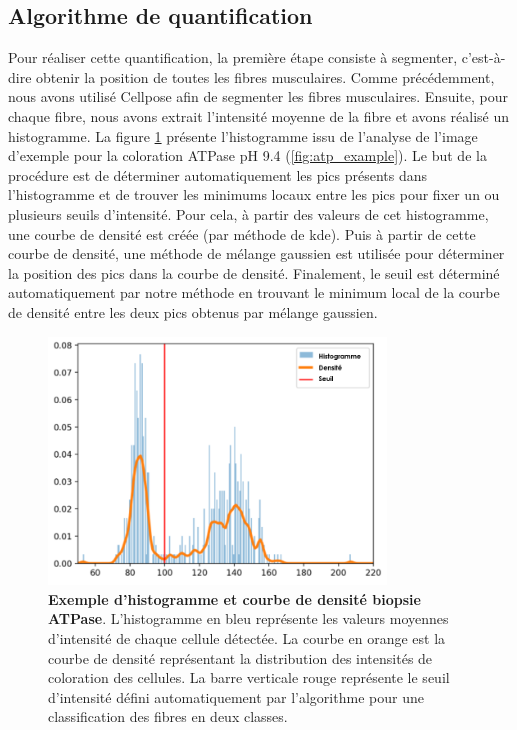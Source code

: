 \subsection{Algorithme de quantification}
Pour réaliser cette quantification, la première étape consiste à segmenter, c'est-à-dire obtenir la position de toutes les fibres musculaires. Comme précédemment, nous avons utilisé Cellpose afin de segmenter les fibres musculaires. Ensuite, pour chaque fibre, nous avons extrait l'intensité moyenne de la fibre et avons réalisé un histogramme. La figure \ref{fig:atp_density} présente l'histogramme issu de l'analyse de l'image d'exemple pour la coloration ATPase pH 9.4 (\ref{fig:atp_example}). Le but de la procédure est de déterminer automatiquement les pics présents dans l'histogramme et de trouver les minimums locaux entre les pics pour fixer un ou plusieurs seuils d'intensité. Pour cela, à partir des valeurs de cet histogramme, une courbe de densité est créée (par méthode de \gls{kde}). Puis à partir de cette courbe de densité, une méthode de mélange gaussien est utilisée pour déterminer la position des pics dans la courbe de densité. Finalement, le seuil est déterminé automatiquement par notre méthode en trouvant le minimum local de la courbe de densité entre les deux pics obtenus par mélange gaussien.
\begin{figure}[!htbp]
 \centering
 \includegraphics[width=0.8\textwidth]{figures/density_plot.png}
 \caption[Exemple d'histogramme et courbe de densité biopsie ATPase]{\textbf{Exemple d'histogramme et courbe de densité biopsie ATPase}. L'histogramme en bleu représente les valeurs moyennes d'intensité de chaque cellule détectée. La courbe en orange est la courbe de densité représentant la distribution des intensités de coloration des cellules. La barre verticale rouge représente le seuil d'intensité défini automatiquement par l'algorithme pour une classification des fibres en deux classes.}
 \label{fig:atp_density}
\end{figure}

